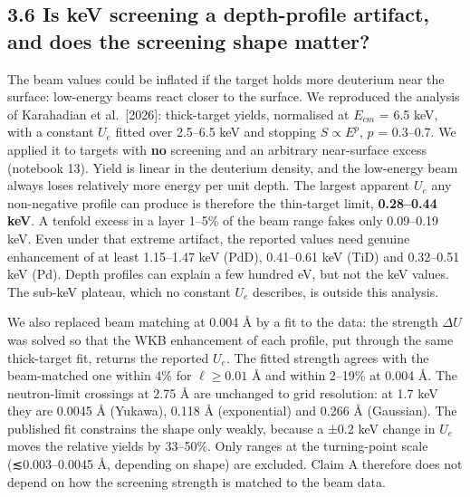 \documentclass[
]{article}
\begin{document}
\hypertarget{is-kev-screening-a-depth-profile-artifact-and-does-the-screening-shape-matter}{%
\subsection{3.6 Is keV screening a depth-profile artifact, and does the
screening shape
matter?}\label{is-kev-screening-a-depth-profile-artifact-and-does-the-screening-shape-matter}}

The beam values could be inflated if the target holds more deuterium
near the surface: low-energy beams react closer to the surface. We
reproduced the analysis of Karahadian et al.~{[}2026{]}: thick-target
yields, normalised at \(E_{cm}\) = 6.5 keV, with a constant \(U_e\)
fitted over 2.5--6.5 keV and stopping \(S\propto E^{p}\), \(p\) =
0.3--0.7. We applied it to targets with \textbf{no} screening and an
arbitrary near-surface excess (notebook 13). Yield is linear in the
deuterium density, and the low-energy beam always loses relatively more
energy per unit depth. The largest apparent \(U_e\) any non-negative
profile can produce is therefore the thin-target limit,
\textbf{0.28--0.44 keV}. A tenfold excess in a layer 1--5\% of the beam
range fakes only 0.09--0.19 keV. Even under that extreme artifact, the
reported values need genuine enhancement of at least 1.15--1.47 keV
(PdD), 0.41--0.61 keV (TiD) and 0.32--0.51 keV (Pd). Depth profiles can
explain a few hundred eV, but not the keV values. The sub-keV plateau,
which no constant \(U_e\) describes, is outside this analysis.

We also replaced beam matching at 0.004 Å by a fit to the data: the
strength \(\Delta U\) was solved so that the WKB enhancement of each
profile, put through the same thick-target fit, returns the reported
\(U_e\). The fitted strength agrees with the beam-matched one within 4\%
for \(\ell \ge 0.01\) Å and within 2--19\% at 0.004 Å. The neutron-limit
crossings at 2.75 Å are unchanged to grid resolution: at 1.7 keV they
are 0.0045 Å (Yukawa), 0.118 Å (exponential) and 0.266 Å (Gaussian). The
published fit constrains the shape only weakly, because a ±0.2 keV
change in \(U_e\) moves the relative yields by 33--50\%. Only ranges at
the turning-point scale (≲0.003--0.0045 Å, depending on shape) are
excluded. Claim A therefore does not depend on how the screening
strength is matched to the beam data.
\end{document}
